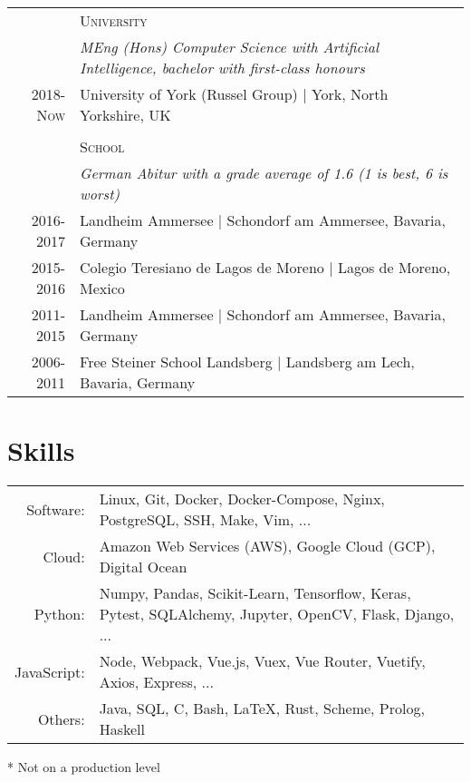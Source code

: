 \documentclass[a4paper,10pt]{article}
\begin{document}
\begin{tabular}{r|p{12cm}}

                    & \textsc{University} \\
                    & \emph{MEng (Hons) Computer Science with Artificial
                      Intelligence, bachelor with first-class honours} \\
\textsc{2018-Now}   & University of York (Russel Group) | York, North Yorkshire, UK \\
\multicolumn{2}{c}{}\\
                    & \textsc{School} \\
                    & \emph{German \emph{Abitur} with a grade average of 1.6 (1
                    is best, 6 is worst)} \\
\textsc{2016-2017}  & Landheim Ammersee | Schondorf am Ammersee, Bavaria, Germany \\
\textsc{2015-2016}  & Colegio Teresiano de Lagos de Moreno |  Lagos de Moreno, Mexico \\
\textsc{2011-2015}  & Landheim Ammersee | Schondorf am Ammersee, Bavaria, Germany \\
\textsc{2006-2011}  & Free Steiner School Landsberg | Landsberg am Lech, Bavaria, Germany \\

\end{tabular}


\section{Skills}
\renewcommand{\thefootnote}{*}
\begin{threeparttable}
\begin{tabular}{ r p{} }
    Software:   & Linux, Git, Docker, Docker-Compose, Nginx, PostgreSQL, SSH, Make, Vim, ... \\
    Cloud:      & Amazon Web Services (AWS), Google Cloud (GCP), Digital Ocean \vspace{2mm} \\
    Python:     & Numpy, Pandas, Scikit-Learn, Tensorflow, Keras, Pytest, SQLAlchemy, Jupyter, OpenCV, Flask, Django, ... \\
    JavaScript: & Node, Webpack, Vue.js, Vuex, Vue Router, Vuetify, Axios, Express, ... \\
    Others:     & Java, SQL, C, Bash, \LaTeX, Rust\footnotemark, Scheme\footnotemark, Prolog\footnotemark, Haskell\footnotemark
\end{tabular}
\begin{tablenotes}
    \small\item[*] Not on a production level
  \end{tablenotes}
\end{threeparttable}
\end{document}
